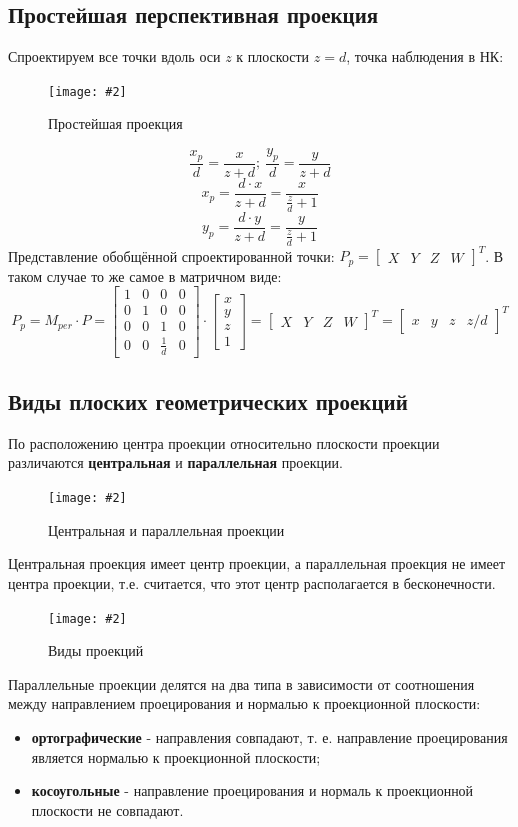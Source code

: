\documentclass[a4paper, 14pt]{extarticle}
\newcommand{\screenshot}[3]{
	\begin{figure}[h]
		\centering
		\texttt{[image: \#2]}
		\caption{#3}
	\end{figure}
}
\begin{document}
\subsection{Простейшая перспективная проекция}
Спроектируем все точки вдоль оси $z$ к плоскости $z=d$, точка наблюдения в НК:
\screenshot{width=6cm}{l5/S035.jpg}{Простейшая проекция}
$$
\dfrac{x_p}{d} = \dfrac{x}{z + d}; \ \dfrac{y_p}{d} = \dfrac{y}{z+d}
$$
$$
x_p = \dfrac{d \cdot x}{z + d} = \dfrac{x}{\frac{z}{d} + 1}
$$
$$
y_p = \dfrac{d \cdot y}{z + d} = \dfrac{y}{\frac{z}{d} + 1}
$$
Представление обобщённой спроектированной точки: $
P_p=\begin{bmatrix} X & Y & Z & W \end{bmatrix}^T
$. В таком случае то же самое в матричном виде:
$$
P_p = M_{per} \cdot P = \begin{bmatrix}
1 & 0 & 0 & 0\\
0 & 1 & 0 & 0\\
0 & 0 & 1 & 0\\
0 & 0 & \frac{1}{d} & 0
\end{bmatrix} 
\cdot \begin{bmatrix} x \\ y \\ z \\ 1 \end{bmatrix} 
= \begin{bmatrix} X & Y & Z & W \end{bmatrix}^T = 
\begin{bmatrix} x & y & z & z/d \end{bmatrix}^T
$$
\subsection{Виды плоских геометрических проекций}
По расположению центра проекции относительно плоскости проекции различаются \textbf{центральная} и \textbf{параллельная} проекции.
\screenshot{width=9cm}{l5/S036.jpg}{Центральная и параллельная проекции}

Центральная проекция имеет центр проекции, а параллельная проекция не имеет центра проекции, т.е. считается, что этот центр располагается в бесконечности.

\screenshot{width=\textwidth}{l5/S037.jpg}{Виды проекций}

Параллельные проекции делятся на два типа в зависимости от соотношения между направлением проецирования и нормалью к проекционной плоскости:
\begin{itemize}
	\item \textbf{ортографические} - направления совпадают, т. е. направление проецирования является нормалью к проекционной плоскости;
	\item \textbf{косоугольные} - направление проецирования и нормаль к проекционной плоскости не совпадают.
\end{itemize}
\end{document}
